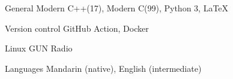 

\begin{cvskills}

  \cvskill
    {General} %
    {Modern C++(17), Modern C(99), Python 3, LaTeX} %

  \cvskill
    {Version control} %
    {GitHub Action, Docker} %

  \cvskill
    {Linux} %
    {GUN Radio} %

  \cvskill
    {Languages} %
    {Mandarin (native), English (intermediate)} %
    
\end{cvskills}
